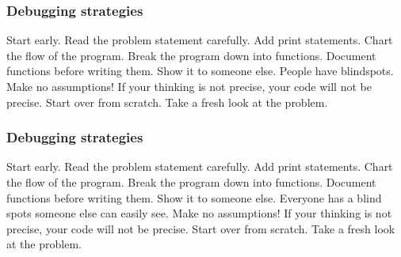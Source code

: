 \documentclass[11pt]{beamer}
\begin{document}

\begin{frame}[fragile]
  \frametitle{Debugging strategies}
  \Enlarge

  \begin{enumerate}
  \myitem  Start early. %
  \myitem  Read the problem statement carefully. %
  \myitem  Add print statements. %
  \myitem  Chart the flow of the program. %
  \myitem  Break the program down into functions. %
  \myitem  Document functions before writing them. %
  \myitem  Show it to someone else. People have blindspots. %
  \myitem  Make no assumptions! If your thinking is not precise, your code will not be precise. %
  \myitem  Start over from scratch. Take a fresh look at the problem.
  \end{enumerate}
\end{frame}

\begin{frame}[fragile]
  \frametitle{Debugging strategies}
  \Enlarge

  \begin{enumerate}
  \myitem  Start early. %
  \myitem  Read the problem statement carefully. %
  \myitem  \textcolor{CS101GradTop}{Add print statements.} %
  \myitem  Chart the flow of the program. %
  \myitem  Break the program down into functions. %
  \myitem  Document functions before writing them. %
  \myitem  \textcolor{CS101GradTop}{Show it to someone else. Everyone has a blind spots someone else can easily see.} %
  \myitem  Make no assumptions! If your thinking is not precise, your code will not be precise. %
  \myitem  Start over from scratch. Take a fresh look at the problem.
  \end{enumerate}
\end{frame}
\end{document}
